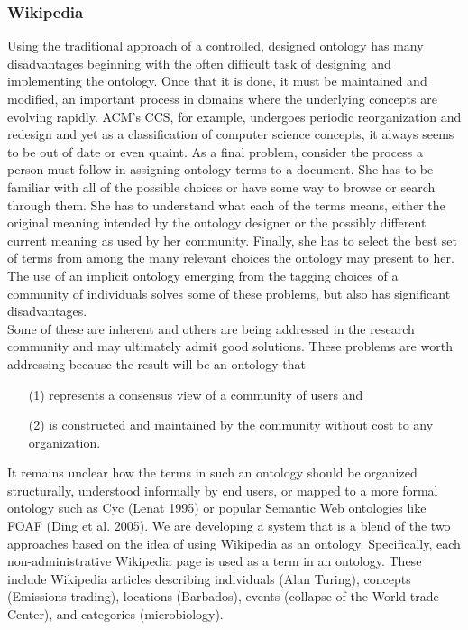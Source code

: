 \subsubsection{Wikipedia}
Using the traditional approach of a controlled, designed ontology has many disadvantages beginning with the often difficult task of designing and implementing the ontology. Once that it is done, it must be maintained and modified, an important process in domains where the underlying concepts are evolving rapidly. ACM’s CCS, for example, undergoes periodic reorganization and redesign and yet as a classification of computer science concepts, it always seems to be out of date or even quaint. As a final problem, consider the process a person must follow in assigning ontology terms to a document. She has to be familiar with all of the possible choices or have some way to browse or search through them. She has to understand what each of the terms means, either the original meaning intended by the ontology designer or the possibly different current meaning as used by her community. Finally, she has to select the best set of terms from among the many relevant choices the ontology may present to her. The use of an implicit ontology emerging from the tagging choices of a community of individuals solves some of these problems, but also has significant disadvantages\citep{wiki_1}.\\
Some of these are inherent and others are being addressed in the research community and may ultimately admit good solutions. These problems are worth addressing because the result will be an ontology that 
\begin{itemize} \item [(1)] represents a consensus view of a community of users and \item [(2)]  is constructed and maintained by the community without cost to any organization. 
\end{itemize}
It remains unclear how the terms in such an ontology should be organized structurally, understood informally by end users, or mapped to a more formal ontology such as Cyc (Lenat 1995) or popular Semantic Web ontologies like FOAF (Ding et al. 2005). 
We are developing a system that is a blend of the two approaches based on the idea of using Wikipedia as an ontology. Specifically, each non-administrative Wikipedia page is used as a term in an ontology. These include Wikipedia articles describing individuals (Alan Turing), concepts (Emissions trading), locations (Barbados), events (collapse of the World trade Center), and categories (microbiology). 
